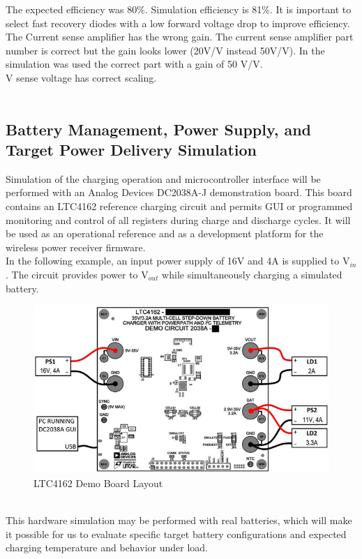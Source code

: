 \documentclass[12pt]{article}
\begin{document}
\indent
The expected efficiency was 80\%. Simulation efficiency is 81\%. It is important to select fast recovery diodes with a low forward voltage drop to improve efficiency.\\
The Current sense amplifier has the wrong gain. The current sense amplifier part number is correct but the gain looks lower (20V/V instead 50V/V). In the simulation was used the correct part with a gain of 50 V/V.\\
V sense voltage has correct scaling.\\
\hfill\\
\pagebreak

\subsection{Battery Management, Power Supply, and Target Power Delivery Simulation}
\indent \indent
Simulation of the charging operation and microcontroller interface will be performed with an Analog Devices DC2038A-J demonstration board. This board contains an LTC4162 reference charging circuit and permits GUI or programmed monitoring and control of all registers during charge and discharge cycles. It will be used as an operational reference and as a development platform for the wireless power receiver firmware.\\
In the following example, an input power supply of 16V and 4A is supplied to V$_{in}$. The circuit provides power to V$_{out}$ while simultaneously charging a simulated battery.\\
\hfill
\begin{figure}[h!]
\centering
\includegraphics[width=0.9\linewidth]{demo_board_layout}
\caption{LTC4162 Demo Board Layout \cite{demoDC2038A}}
\end{figure}
\hfill \\
\indent
This hardware simulation may be performed with real batteries, which will make it possible for us to evaluate specific target battery configurations and expected charging temperature and behavior under load.\\
\end{document}
